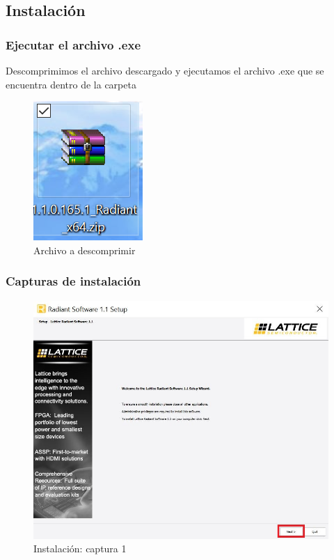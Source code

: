 \documentclass{article}
\begin{document}
\subsection{Instalación}
\subsubsection{Ejecutar el archivo .exe}

Descomprimimos el archivo descargado y ejecutamos el archivo .exe que se encuentra dentro de la carpeta
\begin{figure}[H]
\centering
\includegraphics[width=0.1\linewidth]{Imagenes/zip.PNG}
\caption{Archivo a descomprimir}
\label{fig:install}
\end{figure}

\newpage

\subsubsection{Capturas de instalación}

\begin{figure}[H]
\centering
\includegraphics[width=0.8\linewidth]{Imagenes/inst1.JPG}
\caption{Instalación: captura 1 }
\label{fig:install}
\end{figure}
\end{document}
